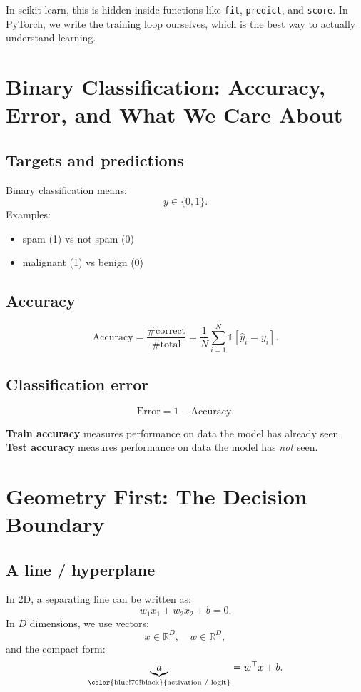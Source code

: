 In scikit-learn, this is hidden inside functions like \texttt{fit}, \texttt{predict}, and \texttt{score}.
In PyTorch, we write the training loop ourselves, which is the best way to actually understand learning.

\section{Binary Classification: Accuracy, Error, and What We Care About}

\subsection{Targets and predictions}
Binary classification means:
\[
y \in \{0,1\}.
\]
Examples:
\begin{itemize}
  \item spam (1) vs not spam (0)
  \item malignant (1) vs benign (0)
\end{itemize}

\subsection{Accuracy}
\[
\text{Accuracy} = \frac{\#\text{correct}}{\#\text{total}}
= \frac{1}{N}\sum_{i=1}^{N}\mathbb{1}[\hat{y}_i = y_i].
\]

\subsection{Classification error}
\[
\text{Error} = 1 - \text{Accuracy}.
\]

\begin{tcolorbox}[colframe=green!50!black,colback=green!3,title=\textbf{\color{green!40!black}Student check: train vs test accuracy}]
\textbf{Train accuracy} measures performance on data the model has already seen. \\
\textbf{Test accuracy} measures performance on data the model has \textit{not} seen. \\
\textbf{\color{red!70!black}{Test accuracy is what you should trust more.}}
\end{tcolorbox}

\section{Geometry First: The Decision Boundary}

\subsection{A line / hyperplane}
In 2D, a separating line can be written as:
\[
w_1x_1 + w_2x_2 + b = 0.
\]
In $D$ dimensions, we use vectors:
\[
x \in \mathbb{R}^D,\quad w \in \mathbb{R}^D,
\]
and the compact form:
\[
\underbrace{a}_{\text{\color{blue!70!black}{activation / logit}}} = w^\top x + b.
\]

